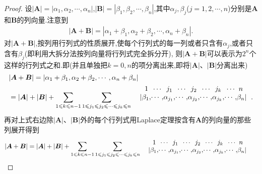 \documentclass[../../main.tex]{subfiles}%
\begin{document}
\begin{proof}

设\(|\boldsymbol{A}| = |\alpha_1,\alpha_2,\cdots,\alpha_n|\),\(|\boldsymbol{B}| = |\beta_1,\beta_2,\cdots,\beta_n|\),其中\(\alpha_j,\beta_j\)(\(j = 1,2,\cdots,n\))分别是\(\boldsymbol{A}\)和\(\boldsymbol{B}\)的列向量.注意到
\begin{align*}
|\boldsymbol{A} + \boldsymbol{B}| = |\alpha_1 + \beta_1,\alpha_2 + \beta_2,\cdots,\alpha_n + \beta_n|.
\end{align*}
对\(|\boldsymbol{A} + \boldsymbol{B}|\),按列用行列式的性质展开,使每个行列式的每一列或者只含有\(\alpha_j\),或者只含有\(\beta_j\)(即利用大拆分法按列向量将行列式完全拆分开),
则\(|\boldsymbol{A} + \boldsymbol{B}|\)可以表示为\(2^n\)个这样的行列式之和.即(并且单独把\(k = 0,n\)的项分离出来,即将\(|\boldsymbol{A}|\)、\(|\boldsymbol{B}|\)分离出来)
\begin{align*}
&|\boldsymbol{A} + \boldsymbol{B}| = |\alpha_1 + \beta_1,\alpha_2 + \beta_2,\cdots,\alpha_n + \beta_n| 
\\
&=|\boldsymbol{A}|+|\boldsymbol{B}|+\sum_{1\leqslant k\leqslant n-1}{\sum_{1\leqslant  j_1\leqslant  j_2\leqslant  \cdots\leqslant  j_k\leqslant  n}{\begin{array}{c}
\begin{array}{c@{}c@{}c@{}c@{}c@{}c@{}c@{}c@{}c@{}c@{}c@{}}
& 1 & \cdots & j_1 &\cdots &j_2 &\cdots &j_k &\cdots &n \\
\left.\right|
&\beta _1,&\cdots ,&\alpha _{j_1},&\cdots ,&\alpha_{j_2},&\cdots ,&\alpha_{j_k},&\cdots ,&\beta_n& \left|\right.
\end{array}\\
\\
\end{array}}}.
\end{align*}
再对上式右边除\(|\boldsymbol{A}|\)、\(|\boldsymbol{B}|\)外的每个行列式用Laplace定理按含有\(\boldsymbol{A}\)的列向量的那些列展开得到
\begin{align*}
&|\boldsymbol{A} + \boldsymbol{B}| =|\boldsymbol{A}|+|\boldsymbol{B}|+\sum_{1\leqslant k\leqslant n-1}{\sum_{1\leqslant  j_1\leqslant  j_2\leqslant  \cdots\leqslant  j_k\leqslant  n}{\begin{array}{c}
\begin{array}{c@{}c@{}c@{}c@{}c@{}c@{}c@{}c@{}c@{}c@{}c@{}}
& 1 & \cdots & j_1 &\cdots &j_2 &\cdots &j_k &\cdots &n \\
\left.\right|
&\beta _1,&\cdots ,&\alpha _{j_1},&\cdots ,&\alpha_{j_2},&\cdots ,&\alpha_{j_k},&\cdots ,&\beta_n& \left|\right.

\end{array}
\end{array}}}
\end{align*}
\end{proof}
\end{document}
